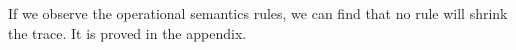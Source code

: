 
If we observe the operational semantics rules, we can find that no rule will shrink the trace. It is proved in the appendix.


